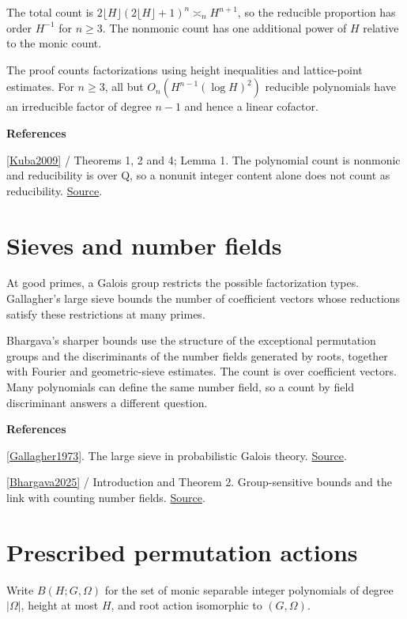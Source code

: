 \documentclass[11pt,a4paper,oneside,openany]{book}
\newcommand{\atlasdisplay}[1]{\par\begingroup\centering\vspace{3pt}\noindent\adjustbox{max width=\linewidth}{\(\displaystyle #1\)}\par\vspace{5pt}\endgroup}
\newenvironment{sources}{\par\smallskip\begingroup\footnotesize\color{atlasgray}\leftskip=10pt\setlength{\parskip}{2pt}}{\par\endgroup\smallskip}
\begin{document}
\atlasdisplay{R_n(H)\asymp_n H^n\quad(n\ge3),\qquad R_2(H)\asymp H^2\log H.}
\color{black} The total count is \(2\lfloor H\rfloor(2\lfloor H\rfloor+1)^n\asymp_n H^{n+1}\), so the reducible proportion has order \(H^{-1}\) for \(n\ge3\). The nonmonic count has one additional power of \(H\) relative to the monic count.\par
\color{black} The proof counts factorizations using height inequalities and lattice-point estimates. For \(n\ge3\), all but \(O_n(H^{n-1}(\log H)^2)\) reducible polynomials have an irreducible factor of degree \(n-1\) and hence a linear cofactor.\par
\begin{sources}
\textbf{References}\par\smallskip
\noindent\hyperlink{ref:Kuba2009}{[Kuba2009]} / Theorems 1, 2 and 4; Lemma 1. The polynomial count is nonmonic and reducibility is over Q, so a nonunit integer content alone does not count as reducibility. \href{https://www.sav.sk/index.php?doc=journal-list&journal_article_no=5434&lang=en&part=article_response_page}{Source}.\par
\end{sources}\color{black}
\section{Sieves and number fields}
\color{black} At good primes, a Galois group restricts the possible factorization types. Gallagher's large sieve bounds the number of coefficient vectors whose reductions satisfy these restrictions at many primes.\par
\color{black} Bhargava's sharper bounds use the structure of the exceptional permutation groups and the discriminants of the number fields generated by roots, together with Fourier and geometric-sieve estimates. The count is over coefficient vectors. Many polynomials can define the same number field, so a count by field discriminant answers a different question.\par
\begin{sources}
\textbf{References}\par\smallskip
\noindent\hyperlink{ref:Gallagher1973}{[Gallagher1973]}. The large sieve in probabilistic Galois theory. \href{https://doi.org/10.1090/pspum/024/0332694}{Source}.\par
\noindent\hyperlink{ref:Bhargava2025}{[Bhargava2025]} / Introduction and Theorem 2. Group-sensitive bounds and the link with counting number fields. \href{https://annals.math.princeton.edu/2025/201-2/p01}{Source}.\par
\end{sources}\color{black}
\section{Prescribed permutation actions}
\color{black} Write \(B(H;G,\Omega)\) for the set of monic separable integer polynomials of degree \(|\Omega|\), height at most \(H\), and root action isomorphic to \((G,\Omega)\).\par
\end{document}
